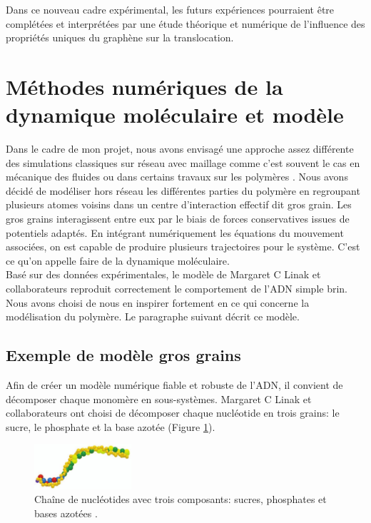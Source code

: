 \documentclass[a4paper,11pt]{article}
\begin{document}
Dans ce nouveau cadre expérimental, les futurs expériences pourraient être complétées et interprétées par une étude théorique et numérique de l'influence des propriétés uniques du graphène sur la translocation.


\newpage
\section{Méthodes numériques de la dynamique moléculaire et modèle}



Dans le cadre de mon projet, nous avons envisagé une approche assez différente des simulations classiques sur réseau avec maillage comme c'est souvent le cas en mécanique des fluides ou dans certains travaux sur les polymères \cite{these}. Nous avons décidé de modéliser hors réseau les différentes parties du polymère en regroupant plusieurs atomes voisins dans un centre d'interaction effectif dit gros grain. Les gros grains interagissent entre eux par le biais de forces conservatives issues de potentiels adaptés. En intégrant numériquement les équations du mouvement associées, on est capable de produire plusieurs trajectoires pour le système. C'est ce qu'on appelle faire de la dynamique moléculaire.\\

Basé sur des données expérimentales, le modèle de Margaret C Linak et collaborateurs \cite{jchem} reproduit correctement le comportement de l'ADN simple brin. Nous avons choisi de nous en inspirer fortement en ce qui concerne la modélisation du polymère. Le paragraphe suivant décrit ce modèle.

\subsection{Exemple de modèle gros grains}

Afin de créer un modèle numérique fiable et robuste de l'ADN, il convient de décomposer chaque monomère en sous-systèmes. Margaret C Linak et collaborateurs \cite{jchem} ont choisi de décomposer chaque nucléotide en trois grains: le sucre, le phosphate et la base azotée (Figure \ref{dnamod}).
\begin{figure}[H]
\begin{center}
\includegraphics[width=0.32\textwidth]{dnamod.jpg}

\caption{Chaîne de nucléotides avec trois composants: sucres, phosphates et bases azotées \cite{jchem}.}
\label{dnamod}
\end{center}
\end{figure}
\end{document}
